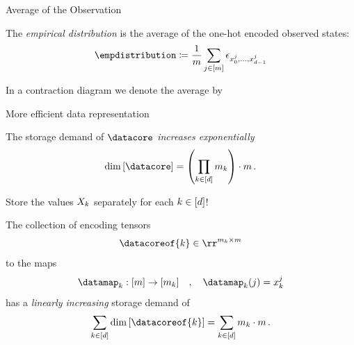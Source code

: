 \documentclass{beamer}
\begin{document}


    \begin{frame}{Average of the Observation}

        The \emph{empirical distribution} is the average of the one-hot encoded observed states:
        \begin{align*}
            \empdistribution \coloneqq \frac{1}{\datanum}\sum_{\datindexin} \onehotmapof{\catindicesof{\datindex}}
        \end{align*}

        In a contraction diagram we denote the average by %
        \begin{center}
        \end{center}

    \end{frame}


    \begin{frame}{More efficient data representation}

        The storage demand of $\datacore$ \emph{increases exponentially }
        \[ \mathrm{dim}\left[\datacore\right] = \left( \facdim \right) \cdot \datanum \, . \]

        \begin{block}{Store the values $X_{k}$ separately for each $k\in[d]$!}

            \medskip

            The collection of encoding tensors
            \[ \datacoreof{\atomenumerator} \in \rr^{\catdimof{\atomenumerator}\times\datanum} \]
            to the maps
            \[ \datamap_{\atomenumerator} :[\datanum] \rightarrow [\catdimof{\atomenumerator}] \quad , \quad  \datamap_{\atomenumerator}(\datindex) =  \catindex^{\datindex}_{\atomenumerator}\]
            has a \emph{linearly increasing} storage demand of
            \[ \sum_{\atomenumeratorin} \mathrm{dim}\left[\datacoreof{\atomenumerator}\right] = \sum_{\atomenumeratorin} \catdimof{\atomenumerator}\cdot \datanum \, .  \]

        \end{block}
    \end{frame}
\end{document}
